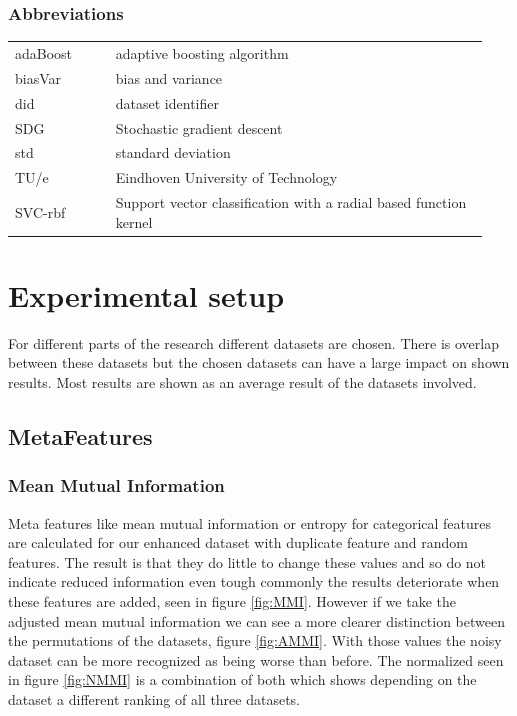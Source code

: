 \documentclass[a4paper,10pt]{article}
\begin{document}
\subsubsection{Abbreviations}
\begin{tabular}{ p{0.20\linewidth} p{0.7437\linewidth} }
	
	adaBoost & adaptive boosting algorithm \\
	
	biasVar & bias and variance \\
	
	did & dataset identifier \\
	
	SDG & Stochastic gradient descent \\
	
	std & standard deviation\\
	
	TU/e & Eindhoven University of Technology \\
	
	SVC-rbf & Support vector classification with a radial based function kernel
	
	
\end{tabular}

\newpage
\section{Experimental setup} \label{Chapter3}
For different parts of the research different datasets are chosen. There is overlap between these datasets but the chosen datasets can have a large impact on shown results. Most results are shown as an average result of the datasets involved.

\subsection{MetaFeatures}

\subsubsection{Mean Mutual Information}
Meta features like mean mutual information or entropy for categorical features are calculated for our enhanced dataset with duplicate feature and random features. The result is that they do little to change these values and so do not indicate reduced information even tough commonly the results deteriorate when these features are added, seen in figure \ref{fig:MMI}. However if we take the adjusted mean mutual information we can see a more clearer distinction between the permutations of the datasets, figure \ref{fig:AMMI}. With those values the noisy dataset can be more recognized as being worse than before. The normalized seen in figure \ref{fig:NMMI}  is a combination of both which shows depending on the dataset a different ranking of all three datasets.
\end{document}
